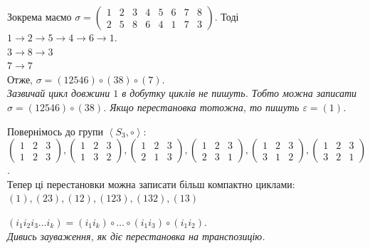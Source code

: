 \documentclass{math_library}
\begin{document}
\begin{example}
Зокрема маємо $\sigma = \begin{pmatrix}
1 & 2 & 3 & 4 & 5 & 6 & 7 & 8 \\
2 & 5 & 8 & 6 & 4 & 1 & 7 & 3
\end{pmatrix}$. Тоді\\
$1 \to 2 \to 5 \to 4 \to 6 \to 1$.\\
$3 \to 8 \to 3$\\
$7 \to 7$\\
Отже, $\sigma = (12546) \circ (38) \circ (7)$.\\
\textit{Зазвичай цикл довжини $1$ в добутку циклів не пишуть. Тобто можна записати $\sigma = (12546) \circ (38)$. Якщо перестановка тотожна, то пишуть $\varepsilon = (1)$.}
\end{example}

\begin{example}
Повернімось до групи $\left< S_3, \circ \right>$:\\
$\begin{pmatrix}
1 & 2 & 3 \\
1 & 2 & 3
\end{pmatrix}, \begin{pmatrix}
1 & 2 & 3 \\
1 & 3 & 2
\end{pmatrix}, \begin{pmatrix}
1 & 2 & 3 \\
2 & 1 & 3
\end{pmatrix}, \begin{pmatrix}
1 & 2 & 3 \\
2 & 3 & 1
\end{pmatrix}, \begin{pmatrix}
1 & 2 & 3 \\
3 & 1 & 2
\end{pmatrix}, \begin{pmatrix}
1 & 2 & 3 \\
3 & 2 & 1
\end{pmatrix}$.\\
Тепер ці перестановки можна записати більш компактно циклами:\\
$(1), (23), (12), (123), (132), (13)$
\end{example}

\begin{corollary}
$(i_1 i_2 i_3\dots i_k) = (i_1 i_k) \circ \dots \circ (i_1 i_3) \circ (i_1 i_2)$.\\
\textit{Дивись зауваження, як діє перестановка на транспозицію.}
\end{corollary}
\end{document}
